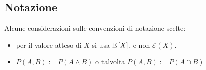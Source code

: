 %
%
%
%


\subsection*{Notazione}
Alcune considerazioni sulle convenzioni di notazione scelte:
\begin{itemize}
	\item per il valore atteso di $X$ si usa $\mathbb{E}\left[ X \right]$, e non $\mathcal{E}(X)$.
	\item $P(A,B):=P(A\land B)$ o talvolta $P(A,B):=P(A\cap B)$
\end{itemize}

